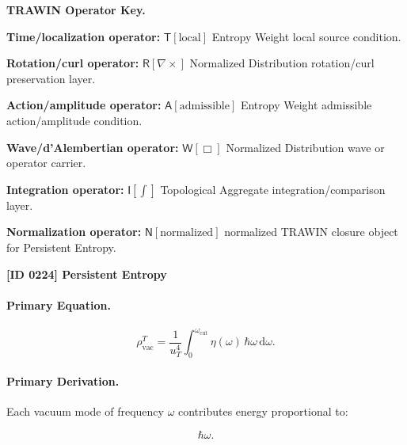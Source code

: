 \par\vspace{0.45\baselineskip}
\noindent\begin{minipage}[t]{\linewidth}
\begingroup
\small
\raggedright
\textbf{TRAWIN Operator Key.}\par
\noindent\textbf{Time/localization operator:} $\mathsf{T}\!\left[\mathrm{local}\right]$ Entropy Weight local source condition.\par
\noindent\textbf{Rotation/curl operator:} $\mathsf{R}\!\left[\nabla\times\right]$ Normalized Distribution rotation/curl preservation layer.\par
\noindent\textbf{Action/amplitude operator:} $\mathsf{A}\!\left[\mathrm{admissible}\right]$ Entropy Weight admissible action/amplitude condition.\par
\noindent\textbf{Wave/d'Alembertian operator:} $\mathsf{W}\!\left[\Box\right]$ Normalized Distribution wave or operator carrier.\par
\noindent\textbf{Integration operator:} $\mathsf{I}\!\left[\int\right]$ Topological Aggregate integration/comparison layer.\par
\noindent\textbf{Normalization operator:} $\mathsf{N}\!\left[\mathrm{normalized}\right]$ normalized TRAWIN closure object for Persistent Entropy.\par
\endgroup
\end{minipage}

\clearpage
\noindent\textbf{[ID 0224] Persistent Entropy}\par
\vspace{0.35em}
\paragraph{Primary Equation.}
\begin{equation}
\rho_{\mathrm{vac}}^{T}
=
\frac{1}{u_T^4}
\int_{0}^{\omega_{\mathrm{cut}}}
\eta(\omega)\,
\hbar\omega\,
\mathrm{d}\omega .
\end{equation}

\paragraph{Primary Derivation.}
Each vacuum mode of frequency $\omega$ contributes energy proportional to:

\begin{equation}
\hbar\omega .
\end{equation}

